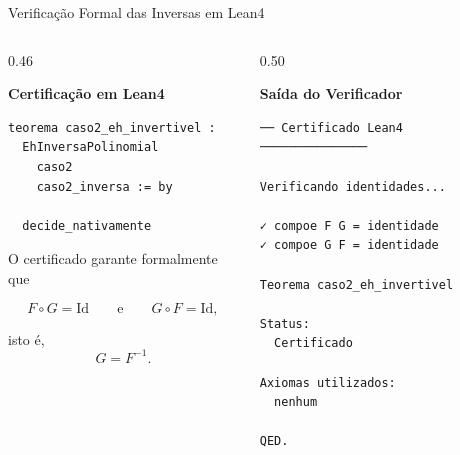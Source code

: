\begin{frame}[fragile]{Verificação Formal das Inversas em Lean4}


\begin{columns}[T]

\begin{column}{0.46\textwidth}

\textbf{Certificação em Lean4}

\begin{lstlisting}
teorema caso2_eh_invertivel :
  EhInversaPolinomial
    caso2
    caso2_inversa := by

  decide_nativamente
\end{lstlisting}

\vspace{0.4cm}

\small

O certificado garante formalmente que

\[
F\circ G=\mathrm{Id}
\qquad\text{e}\qquad
G\circ F=\mathrm{Id},
\]

isto é, \[G=F^{-1}.\]

\end{column}

\begin{column}{0.50\textwidth}

\textbf{Saída do Verificador}

\begin{lstlisting}[language={},basicstyle=\ttfamily\tiny,
backgroundcolor=\color{LightGreen},
rulecolor=\color{DarkGreen}]
── Certificado Lean4 ───────────────

Verificando identidades...

✓ compoe F G = identidade
✓ compoe G F = identidade

Teorema caso2_eh_invertivel

Status:
  Certificado

Axiomas utilizados:
  nenhum

QED.
\end{lstlisting}

\end{column}

\end{columns}

\end{frame}